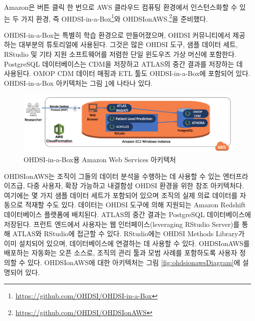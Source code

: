 \documentclass[11pt]{book}
\let\rmarkdownfootnote\footnote%
\def\footnote{\protect\rmarkdownfootnote}
\theoremstyle{definition}
\theoremstyle{definition}
\theoremstyle{definition}
\theoremstyle{remark}
\begin{document}
Amazon은 버튼 클릭 한 번으로 AWS 클라우드 컴퓨팅 환경에서 인스턴스화할
수 있는 두 가지 환경, 즉 OHDSI-in-a-Box\footnote{\url{https://github.com/OHDSI/OHDSI-in-a-Box}}와
OHDSIonAWS.\footnote{\url{https://github.com/OHDSI/OHDSIonAWS}}을
준비했다. 

OHDSI-in-a-Box는 특별히 학습 환경으로 만들어졌으며, OHDSI 커뮤니티에서
제공하는 대부분의 튜토리얼에 사용된다. 그것은 많은 OHDSI 도구, 샘플
데이터 세트, RStudio 및 기타 지원 소프트웨어를 저렴한 단일 윈도우즈 가상
머신에 포함한다. PostgreSQL 데이터베이스는 CDM을 저장하고 ATLAS의 중간
결과를 저장하는 데 사용된다. OMOP CDM 데이터 매핑과 ETL 툴도
OHDSI-in-a-Box에 포함되어 있다. OHDSI-in-a-Box 아키텍처는 그림
\ref{fig:ohdsiinaboxDiagram}에 나타나 있다.

\begin{figure}

{\centering \includegraphics[width=1\linewidth]{images/OhdsiAnalyticsTools/OHDSI-in-a-BoxDiagram} 

}

\caption{OHDSI-in-a-Box용 Amazon Web Services 아키텍처}\label{fig:ohdsiinaboxDiagram}
\end{figure}

OHDSIonAWS는 조직이 그들의 데이터 분석을 수행하는 데 사용할 수 있는
엔터프라이즈급, 다중 사용자, 확장 가능하고 내결함성 OHDSI 환경을 위한
참조 아키텍처다. 여기에는 몇 가지 샘플 데이터 세트가 포함되어 있으며
조직의 실제 의료 데이터를 자동으로 적재할 수도 있다. 데이터는 OHDSI
도구에 의해 지원되는 Amazon Redshift 데이터베이스 플랫폼에 배치된다.
ATLAS의 중간 결과는 PostgreSQL 데이터베이스에 저장된다. 프런트 엔드에서
사용자는 웹 인터페이스(leveraging RStudio Server)를 통해 ATLAS와
RStudio에 접근할 수 있다. RStudio에는 OHDSI Methods Library가 이미
설치되어 있으며, 데이터베이스에 연결하는 데 사용할 수 있다. OHDSIonAWS를
배포하는 자동화는 오픈 소스로, 조직의 관리 툴과 모범 사례를 포함하도록
사용자 정의할 수 있다. OHDSIonAWS에 대한 아키텍처는 그림
\ref{fig:ohdsionawsDiagram}에 설명되어 있다.
\end{document}
